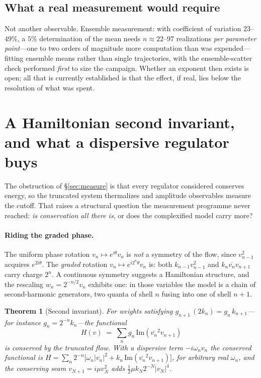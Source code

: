 \documentclass[11pt,a4paper]{article}
\newtheorem{theorem}{Theorem}
\theoremstyle{definition}
\theoremstyle{remark}
\newcommand{\conj}[1]{\overline{#1}}
\begin{document}
\subsection{What a real measurement would require}

Not another observable. Ensemble measurement: with coefficient of variation $23$--$49\%$,
a $5\%$ determination of the mean needs $n\approx22$--$97$ realizations \emph{per
parameter point}---one to two orders of magnitude more computation than was expended---%
fitting ensemble means rather than single trajectories, with the ensemble-scatter check
performed \emph{first} to size the campaign. Whether an exponent then exists is open; all
that is currently established is that the effect, if real, lies below the resolution of
what was spent.

\section{A Hamiltonian second invariant, and what a dispersive regulator buys}
\label{sec:hamiltonian}

The obstruction of \S\ref{sec:measure} is that every regulator considered conserves energy,
so the truncated system thermalizes and amplitude observables measure the cutoff. That
raises a structural question the measurement programme never reached: \emph{is
conservation all there is}, or does the complexified model carry more?

\paragraph{Riding the graded phase.} The uniform phase rotation $v_n \mapsto e^{i\theta}v_n$
is \emph{not} a symmetry of the flow, since $v_{n-1}^2$ acquires $e^{2i\theta}$. The
\emph{graded} rotation $v_n \mapsto e^{i2^n\theta}v_n$ is: both $k_{n-1}v_{n-1}^2$ and
$k_n\conj{v_n}v_{n+1}$ carry charge $2^n$. A continuous symmetry suggests a Hamiltonian
structure, and the rescaling $w_n = 2^{-n/2}v_n$ exhibits one: in those variables the model
is a chain of second-harmonic generators, two quanta of shell $n$ fusing into one of shell
$n+1$.

\begin{theorem}[Second invariant]
\label{thm:second}
For weights satisfying $g_{n+1}\,(2k_n) = g_n\,k_{n+1}$---for instance $g_n = 2^{-n}k_n$---the
functional
\[
   H(v) \;=\; \sum_n g_n\,\mathrm{Im}\!\left(\conj{v_n}^2 v_{n+1}\right)
\]
is conserved by the truncated flow. With a dispersive term $-i\omega_n v_n$ the conserved
functional is $H = \sum_n 2^{-n}\bigl[\omega_n|v_n|^2 + k_n\,\mathrm{Im}(\conj{v_n}^2
v_{n+1})\bigr]$, for \emph{arbitrary} real $\omega_n$, and the conserving seam
$v_{N+1} = i\mu v_N^2$ adds $\tfrac12\mu k_N 2^{-N}|v_N|^4$.
\end{theorem}
\end{document}
